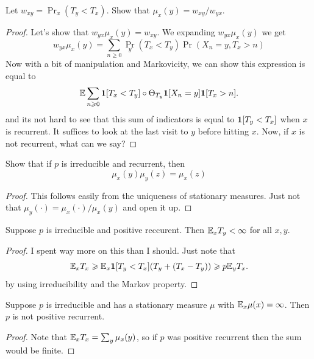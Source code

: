 \begin{exercise}[5.5.2]
    Let $w_{xy} = \Pr_x(T_y < T_x)$. Show that $\mu_x(y) = w_{xy}/w_{yx}$.
\end{exercise}
\begin{proof}
    Let's show that $w_{yx}\mu_x(y) = w_{xy}$. We expanding $w_{yx}\mu_x(y)$ 
    we get
    \[
    w_{yx}\mu_x(y) = \sum_{n \geq 0} \Pr_y(T_x < T_y)\Pr(X_n = y, T_x > n)
    \]
    Now with a bit of manipulation and Markovicity, we can show this expression 
    is equal to 
    \[
        \mathbb{E} \sum_{n \geqslant 0} \bm{1}[T_x < T_y] \circ \Theta_{T_y} \bm{1}[X_n = y] \bm{1}[T_x > n].
    \]
    and its not hard to see that this sum of indicators is equal to $\bm{1}[T_y < T_x]$
    when $x$ is recurrent. It suffices to look at the last visit to $y$ before hitting $x$.
    Now, if $x$ is not recurrent, what can we say? 
\end{proof}

\begin{exercise}[5.5.3]
    Show that if $p$ is irreducible and recurrent, then
    \[
    \mu_x(y)\mu_y(z) = \mu_x(z)
    \]
\end{exercise}
\begin{proof}
    This follows easily from the uniqueness of stationary measures. Just not that 
    $\mu_y(\cdot) = \mu_x(\cdot)/\mu_x(y)$ and open it up.
\end{proof}


\begin{exercise}[5.5.4]
    Suppose $p$ is irreducible and positive reccurent. Then $\mathbb{E}_x T_y < \infty$ for all $x,y$.
\end{exercise}
\begin{proof}
    I spent way more on this than I should. Just note that 
    \[
    \mathbb{E}_x T_x \geqslant \mathbb{E}_x \bm{1}[T_y < T_x](T_y + (T_x - T_y)) \geqslant p \mathbb{E}_y T_x.
    \]
    by using irreducibility and the Markov property.
\end{proof}

\begin{exercise}[5.5.5]
    Suppose $p$ is irreducible and has a stationary measure $\mu$ with $\mathbb{E}_x \mu(x) = \infty$.
    Then $p$ is not positive recurrent.
\end{exercise}
\begin{proof}
    Note that $\mathbb{E}_{x} T_x = \sum_y \mu_x(y)$, so if $p$ was positive recurrent then 
    the sum would be finite. 
\end{proof}

